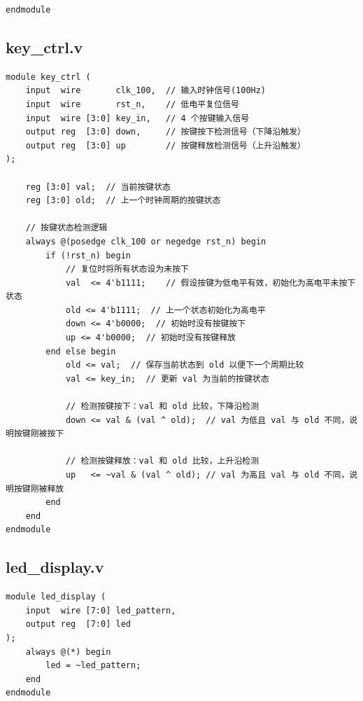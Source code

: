 \documentclass[a4paper,10pt]{article}
\begin{document}
\begin{lstlisting}[caption=iic_drive.v]
endmodule 
\end{lstlisting}

\subsection{key_ctrl.v}
\begin{lstlisting}[caption=key_ctrl.v]
module key_ctrl (
    input  wire       clk_100,  // 输入时钟信号(100Hz)
    input  wire       rst_n,    // 低电平复位信号
    input  wire [3:0] key_in,   // 4 个按键输入信号
    output reg  [3:0] down,     // 按键按下检测信号（下降沿触发）
    output reg  [3:0] up        // 按键释放检测信号（上升沿触发）
);

    reg [3:0] val;  // 当前按键状态
    reg [3:0] old;  // 上一个时钟周期的按键状态

    // 按键状态检测逻辑
    always @(posedge clk_100 or negedge rst_n) begin
        if (!rst_n) begin
            // 复位时将所有状态设为未按下
            val  <= 4'b1111;    // 假设按键为低电平有效，初始化为高电平未按下状态
            old <= 4'b1111;  // 上一个状态初始化为高电平
            down <= 4'b0000;  // 初始时没有按键按下
            up <= 4'b0000;  // 初始时没有按键释放
        end else begin
            old <= val;  // 保存当前状态到 old 以便下一个周期比较
            val <= key_in;  // 更新 val 为当前的按键状态

            // 检测按键按下：val 和 old 比较，下降沿检测
            down <= val & (val ^ old);  // val 为低且 val 与 old 不同，说明按键刚被按下

            // 检测按键释放：val 和 old 比较，上升沿检测
            up   <= ~val & (val ^ old); // val 为高且 val 与 old 不同，说明按键刚被释放
        end
    end
endmodule

\end{lstlisting}

\subsection{led_display.v}
\begin{lstlisting}[caption=led_display.v]
module led_display (
    input  wire [7:0] led_pattern,
    output reg  [7:0] led
);
    always @(*) begin
        led = ~led_pattern;
    end
endmodule

\end{lstlisting}
\end{document}
